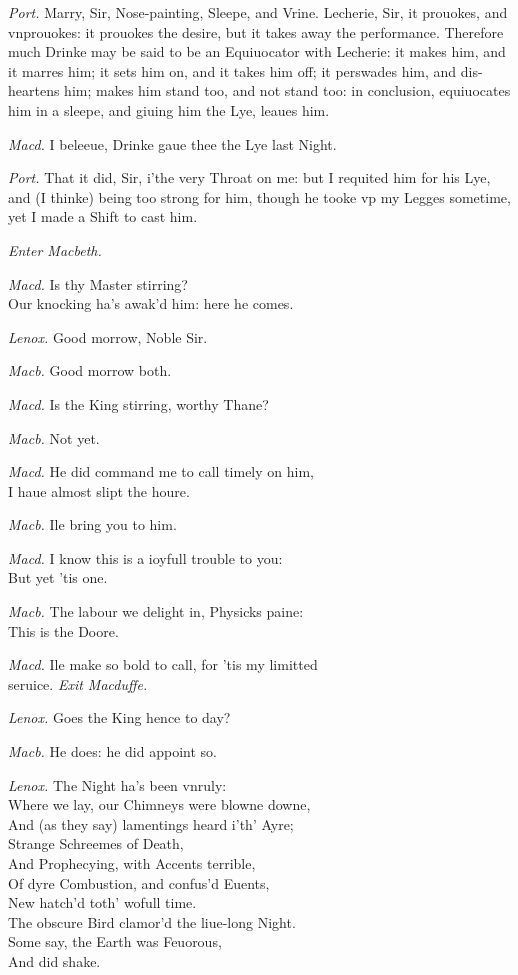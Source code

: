 \documentclass[12pt]{sides}
\newcommand{\clStageDir}[1]{\hspace*{\fill}\textit{#1}\hspace*{\fill}}
\newcommand{\elStageDir}[1]{\hfill\textit{#1}}
\newcommand{\dia}[1]{\hskip 15pt\textit{#1}\hskip 6pt}
\begin{document}
\begin{multicols}{2}
            \dia{Port.} Marry, Sir, Nose-painting, Sleepe, and Vrine. Lecherie, Sir, it prouokes, and vnprouokes: it prouokes the desire, but it takes away the performance. Therefore much Drinke may be said to be an Equiuocator with Lecherie: it makes him, and it marres him; it sets him on, and it takes him off; it perswades him, and dis-heartens him; makes him stand too, and not stand too: in conclusion, equiuocates him in a sleepe, and giuing him the Lye, leaues him.

            \dia{Macd.} I beleeue, Drinke gaue thee the Lye last Night.

            \dia{Port.} That it did, Sir, i'the very Throat on me: but I requited him for his Lye, and (I thinke) being too strong for him, though he tooke vp my Legges sometime, yet I made a Shift to cast him.
            
            \clStageDir{Enter Macbeth.}
            
            \dia{Macd.} Is thy Master stirring? \\ Our knocking ha's awak'd him: here he comes.

            \dia{Lenox.} Good morrow, Noble Sir.

            \dia{Macb.} Good morrow both.

            \dia{Macd.} Is the King stirring, worthy Thane?

            \dia{Macb.} Not yet.

            \dia{Macd.} He did command me to call timely on him, \\ I haue almost slipt the houre.

            \dia{Macb.} Ile bring you to him.

            \dia{Macd.} I know this is a ioyfull trouble to you: \\ But yet 'tis one.

            \dia{Macb.} The labour we delight in, Physicks paine: \\ This is the Doore.

            \dia{Macd.} Ile make so bold to call, for 'tis my limitted \\ seruice. \elStageDir{Exit Macduffe.} \hspace{64pt}

            \dia{Lenox.} Goes the King hence to day?

            \dia{Macb.} He does: he did appoint so.

            \dia{Lenox.} The Night ha's been vnruly: \\ Where we lay, our Chimneys were blowne downe, \\ And (as they say) lamentings heard i'th' Ayre; \\ Strange Schreemes of Death, \\ And Prophecying, with Accents terrible, \\ Of dyre Combustion, and confus'd Euents, \\ New hatch'd toth' wofull time. \\ The obscure Bird clamor'd the liue-long Night. \\ Some say, the Earth was Feuorous, \\ And did shake.


\end{multicols}
\end{document}
